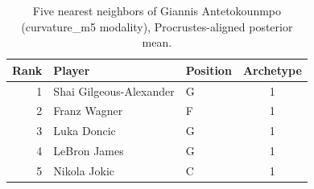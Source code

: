 \begin{table}[htbp]
  \centering\small
  \begin{tabular}{rllc}
    \toprule
    Rank & Player & Position & Archetype \\
    \midrule
    1 & Shai Gilgeous-Alexander & G & 1 \\
    2 & Franz Wagner & F & 1 \\
    3 & Luka Doncic & G & 1 \\
    4 & LeBron James & G & 1 \\
    5 & Nikola Jokic & C & 1 \\
    \bottomrule
  \end{tabular}
  \caption{Five nearest neighbors of Giannis Antetokounmpo (curvature_m5 modality), Procrustes-aligned posterior mean.}
  \label{tab:Giannis_Antetokounmpo_neighbors_curvature_m5}
\end{table}

